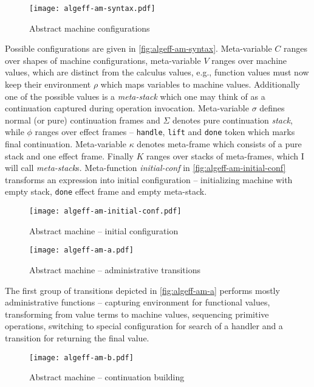 \documentclass[inz, english, longabstract]{iithesis}
\begin{document}
\begin{figure}[t]
  \centering
  \texttt{[image: algeff-am-syntax.pdf]}
  \caption{Abstract machine configurations}
  \label{fig:algeff-am-syntax}
\end{figure}

Possible configurations are given in \autoref{fig:algeff-am-syntax}.
Meta-variable $ C $ ranges over shapes of machine configurations, meta-variable $ V $ ranges over machine values, which are distinct from the calculus values, e.g., function values must now keep their environment $ \rho $ which maps variables to machine values.
Additionally one of the possible values is a \emph{meta-stack} which one may think of as a continuation captured during operation invocation.
Meta-variable $ \sigma $ defines normal (or pure) continuation frames and $ \Sigma $ denotes pure continuation \emph{stack}, while $ \phi $ ranges over effect frames -- \texttt{handle}, \texttt{lift} and \texttt{done} token which marks final continuation.
Meta-variable $ \kappa $ denotes meta-frame which consists of a pure stack and one effect frame.
Finally $ K $ ranges over stacks of meta-frames, which I will call \emph{meta-stack}s.
Meta-function \textit{initial-conf} in \autoref{fig:algeff-am-initial-conf} transforms an expression into initial configuration -- initializing machine with empty stack, \texttt{done} effect frame and empty meta-stack.

\begin{figure}[t]
  \centering
  \texttt{[image: algeff-am-initial-conf.pdf]}
  \caption{Abstract machine -- initial configuration}
  \label{fig:algeff-am-initial-conf}
\end{figure}

\begin{figure}[t]
  \centering
  \texttt{[image: algeff-am-a.pdf]} 
  \caption{Abstract machine -- administrative transitions}
  \label{fig:algeff-am-a}
\end{figure}

The first group of transitions depicted in \autoref{fig:algeff-am-a} performs mostly administrative functions -- capturing environment for functional values, transforming from value terms to machine values, sequencing primitive operations, switching to special configuration for search of a handler and a transition for returning the final value.

\begin{figure}[t]
  \centering
  \texttt{[image: algeff-am-b.pdf]} 
  \caption{Abstract machine -- continuation building}
  \label{fig:algeff-am-b}
\end{figure}
\end{document}
